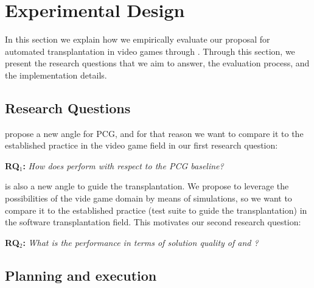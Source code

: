 \section{Experimental Design} 
\label{sec:Evaluation}

In this section we explain how we empirically evaluate our proposal for automated transplantation in video games through \ApproachName{}. Through this section, we present the research questions that we aim to answer, the evaluation process, and the implementation details.

\subsection{Research Questions}

\simhotep{} propose a new angle for PCG, and for that reason we want to compare it to the established practice in the video game field in our first research question:

\textbf{RQ$_1$: }\textit{How does \simhotep{} perform with respect to the PCG baseline?}

\simhotep is also a new angle to guide the transplantation. We propose to leverage the possibilities of the vide game domain by means of simulations, so we want to compare it to the established practice (test suite to guide the transplantation) in the software transplantation field. This motivates our second research question:

\textbf{RQ$_2$: }\textit{What is the performance in terms of solution quality of \simhotep{} and \timhotep{}?}





\subsection{Planning and execution}


